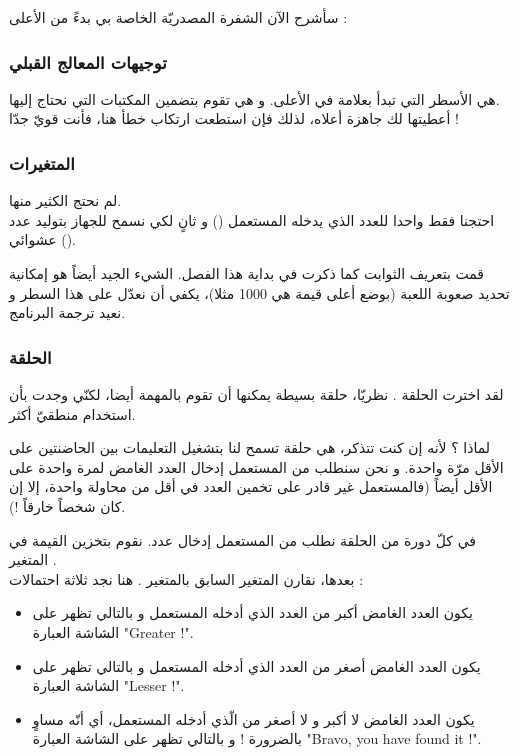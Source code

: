 سأشرح الآن الشفرة المصدريّة الخاصة بي بدءً من الأعلى :

\subsubsection{توجيهات المعالج القبلي}

هي الأسطر التي تبدأ بعلامة 
\InlineCode{\#}
في الأعلى. و هي تقوم بتضمين المكتبات التي نحتاج إليها.\\
أعطيتها لك جاهزة أعلاه، لذلك فإن استطعت ارتكاب خطأ هنا، فأنت قويّ جدّا !

\subsubsection{المتغيرات}

لم نحتج الكثير منها.\\
احتجنا فقط واحدا للعدد الذي يدخله المستعمل
() 
و ثانٍ لكي نسمح للجهاز بتوليد عدد عشوائي 
().

قمت بتعريف الثوابت كما ذكرت في بداية هذا الفصل. الشيء الجيد أيضاً هو إمكانية تحديد صعوبة اللعبة (بوضع أعلى قيمة هي 1000 مثلا)، يكفي أن نعدّل على هذا السطر و نعيد ترجمة البرنامج.

\subsubsection{الحلقة}

لقد اخترت الحلقة 
.
نظريّا، حلقة 
بسيطة يمكنها أن تقوم بالمهمة أيضا، لكنّي وجدت بأن استخدام 
منطقيّ أكثر. 

لماذا ؟  لأنه إن كنت تتذكر، 
هي حلقة تسمح لنا بتشغيل التعليمات بين الحاضنتين على الأقل مرّة واحدة. و نحن سنطلب من المستعمل إدخال العدد الغامض لمرة واحدة على الأقل أيضاً (فالمستعمل غير قادر على تخمين العدد في أقل من محاولة واحدة، إلا إن كان شخصاً خارقاً !).

في كلّ دورة من الحلقة نطلب من المستعمل إدخال عدد. نقوم بتخزين القيمة في المتغير 
.\\
بعدها، نقارن المتغير السابق بالمتغير 
.
هنا نجد ثلاثة احتمالات :

\begin{itemize}
	\item يكون العدد الغامض أكبر من العدد الذي أدخله المستعمل و بالتالي تظهر على الشاشة العبارة
	"\textenglish{Greater !}".
	\item يكون العدد الغامض أصغر من العدد الذي أدخله المستعمل و بالتالي تظهر على الشاشة العبارة
	"\textenglish{Lesser !}".
	\item يكون العدد الغامض لا أكبر و لا أصغر من الّذي أدخله المستعمل، أي أنّه مساوٍ بالضرورة ! و بالتالي تظهر على الشاشة العبارة
	"\textenglish{Bravo, you have found it !}".
\end{itemize}

